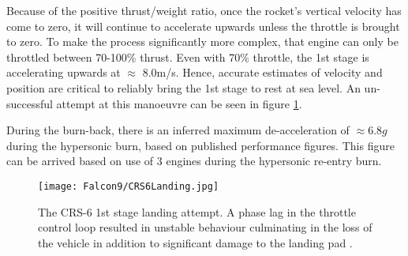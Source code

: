 Because of the positive thrust/weight ratio, once the rocket's vertical velocity has come to zero, it will continue to accelerate upwards unless the throttle is brought to zero. To make the process significantly more complex, that engine can only be throttled between 70-100\% thrust. Even with 70\% throttle, the 1st stage is accelerating upwards at $\approx$ 8.0m/s. Hence, accurate estimates of velocity and position are critical to reliably bring the 1st stage to rest at sea level. An un-successful attempt at this manoeuvre can be seen in figure \ref{fig:Kaboom}.

During the burn-back, there is an inferred maximum de-acceleration of $\approx 6.8 g$ during the hypersonic burn, based on published performance figures. This figure can be arrived based on use of 3 engines during the hypersonic re-entry burn. 


\begin{figure}[!htb] 
    \centering
    \texttt{[image: Falcon9/CRS6Landing.jpg]} 
    \caption{The CRS-6 1st stage landing attempt. A phase lag in the throttle control loop resulted in unstable behaviour culminating in the  loss of the vehicle in addition to significant damage to the landing pad \cite{SpaceXPhotos}.}
    \label{fig:Kaboom}
\end{figure}


